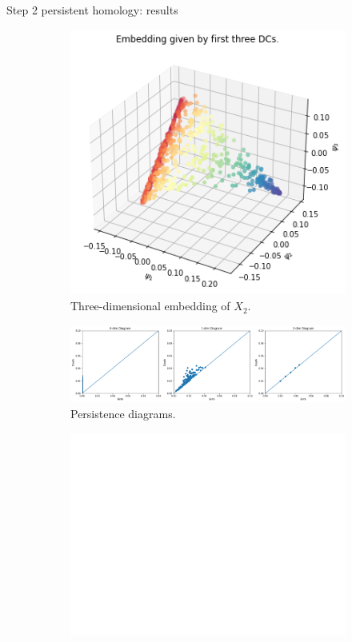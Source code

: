 \documentclass[xcolor={dvipsnames,svgnames}]{beamer}
\begin{document}
\begin{frame}{Step 2 persistent homology: results}
\begin{figure}[H]
\centering
\begin{subfigure}[b]{0.2\textwidth}
    \includegraphics[width=\textwidth]{figures/X2_embedding.png}
    \caption{Three-dimensional embedding of $X_2$.}
\end{subfigure}
\hfill
\begin{subfigure}[b]{0.75\textwidth}
    \includegraphics[width=\textwidth]{figures/X2_H0.png}
    \caption{Persistence diagrams.}
\end{subfigure}
\begin{subfigure}[b]{0.25\textwidth}
\includegraphics[width=\textwidth]{figures/white.png} 

\end{subfigure}
\end{figure}
\end{frame}
\end{document}
